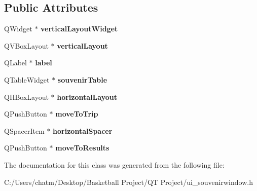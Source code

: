 \subsection*{Public Attributes}
\begin{DoxyCompactItemize}
\item 
\mbox{\label{class_ui___souvenir_window_a8119b61098daa178514ea25c5a4eec94}} 
Q\+Widget $\ast$ {\bfseries vertical\+Layout\+Widget}
\item 
\mbox{\label{class_ui___souvenir_window_a30b4382fb27344ed0aa86fd24a879ee0}} 
Q\+V\+Box\+Layout $\ast$ {\bfseries vertical\+Layout}
\item 
\mbox{\label{class_ui___souvenir_window_aee652da48164420602d6904cb02dc535}} 
Q\+Label $\ast$ {\bfseries label}
\item 
\mbox{\label{class_ui___souvenir_window_ac6df2f57b4d177d982755d7021c3e5af}} 
Q\+Table\+Widget $\ast$ {\bfseries souvenir\+Table}
\item 
\mbox{\label{class_ui___souvenir_window_a79c11ddd9f1a70ebe965962c95077299}} 
Q\+H\+Box\+Layout $\ast$ {\bfseries horizontal\+Layout}
\item 
\mbox{\label{class_ui___souvenir_window_ad2bd50962eb1ba7d6e2c2cbdb85baca6}} 
Q\+Push\+Button $\ast$ {\bfseries move\+To\+Trip}
\item 
\mbox{\label{class_ui___souvenir_window_ac1c4c10e39f74ec80c9a7d672466cfda}} 
Q\+Spacer\+Item $\ast$ {\bfseries horizontal\+Spacer}
\item 
\mbox{\label{class_ui___souvenir_window_a58cc53dfce3fcbe5a5f5fb56bb176571}} 
Q\+Push\+Button $\ast$ {\bfseries move\+To\+Results}
\end{DoxyCompactItemize}


The documentation for this class was generated from the following file\+:\begin{DoxyCompactItemize}
\item 
C\+:/\+Users/chatm/\+Desktop/\+Basketball Project/\+Q\+T Project/ui\+\_\+souvenirwindow.\+h\end{DoxyCompactItemize}
